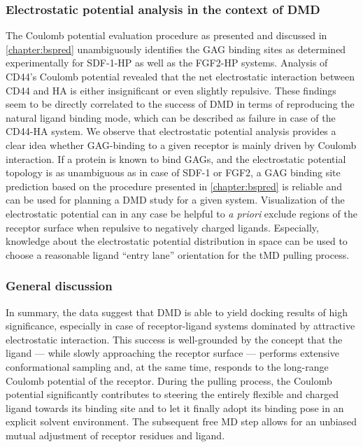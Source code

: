 \subsubsection{Electrostatic potential analysis in the context of DMD}

The Coulomb potential evaluation procedure as presented and discussed in
\cref{chapter:bspred} unambiguously identifies the GAG binding sites as
determined experimentally for SDF-1-HP as well as the FGF2-HP systems. Analysis
of CD44's Coulomb potential revealed that the net electrostatic interaction
between CD44 and HA is either insignificant or even slightly repulsive. These
findings seem to be directly correlated to the success of DMD in terms of
reproducing the natural ligand binding mode, which can be described as failure
in case of the CD44-HA system. We observe that electrostatic potential analysis
provides a clear idea whether GAG-binding to a given receptor is mainly driven
by Coulomb interaction. If a protein is known to bind GAGs, and the
electrostatic potential topology is as unambiguous as in case of SDF-1 or FGF2,
a GAG binding site prediction based on the procedure presented in
\cref{chapter:bspred} is reliable and can be used for planning a DMD study for a
given system. Visualization of the electrostatic potential can in any case be
helpful to \textit{a priori} exclude regions of the receptor surface when
repulsive to negatively charged ligands. Especially, knowledge about the
electrostatic potential distribution in space can be used to choose a reasonable
ligand \enquote{entry lane} orientation for the tMD pulling process.


\subsubsection{General discussion}

In summary, the data suggest that DMD is able to yield docking results of high
significance, especially in case of receptor-ligand systems dominated by
attractive electrostatic interaction. This success is well-grounded by the
concept that the ligand --- while slowly approaching the receptor surface ---
performs extensive conformational sampling and, at the same time, responds to
the long-range Coulomb potential of the receptor. During the pulling process,
the Coulomb potential significantly contributes to steering the entirely
flexible and charged ligand towards its binding site and to let it finally adopt
its binding pose in an explicit solvent environment. The subsequent free MD step
allows for an unbiased mutual adjustment of receptor residues and ligand.

